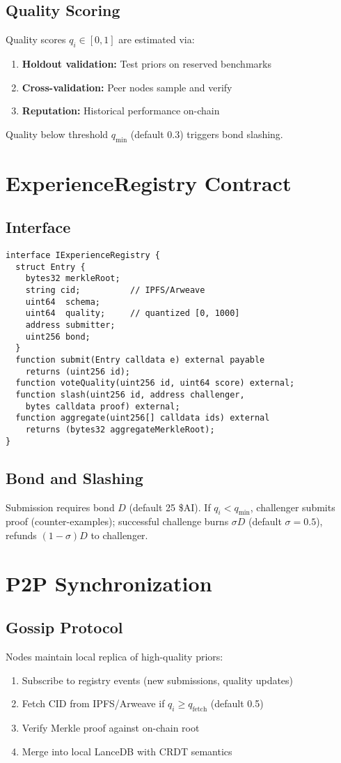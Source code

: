 \documentclass[11pt]{article}
\begin{document}
\subsection{Quality Scoring}
Quality scores \(q_i \in [0,1]\) are estimated via:
\begin{enumerate}
  \item \textbf{Holdout validation:} Test priors on reserved benchmarks
  \item \textbf{Cross-validation:} Peer nodes sample and verify
  \item \textbf{Reputation:} Historical performance on-chain
\end{enumerate}

Quality below threshold \(q_{\min}\) (default 0.3) triggers bond slashing.

\section{ExperienceRegistry Contract}
\subsection{Interface}
\begin{verbatim}
interface IExperienceRegistry {
  struct Entry {
    bytes32 merkleRoot;
    string cid;          // IPFS/Arweave
    uint64  schema;
    uint64  quality;     // quantized [0, 1000]
    address submitter;
    uint256 bond;
  }
  function submit(Entry calldata e) external payable
    returns (uint256 id);
  function voteQuality(uint256 id, uint64 score) external;
  function slash(uint256 id, address challenger,
    bytes calldata proof) external;
  function aggregate(uint256[] calldata ids) external
    returns (bytes32 aggregateMerkleRoot);
}
\end{verbatim}

\subsection{Bond and Slashing}
Submission requires bond \(D\) (default 25 \$AI). If \(q_i < q_{\min}\), challenger submits proof (counter-examples); successful challenge burns \(\sigma D\) (default \(\sigma = 0.5\)), refunds \((1-\sigma)D\) to challenger.

\section{P2P Synchronization}
\subsection{Gossip Protocol}
Nodes maintain local replica of high-quality priors:
\begin{enumerate}
  \item Subscribe to registry events (new submissions, quality updates)
  \item Fetch CID from IPFS/Arweave if \(q_i \ge q_{\text{fetch}}\) (default 0.5)
  \item Verify Merkle proof against on-chain root
  \item Merge into local LanceDB with CRDT semantics
\end{enumerate}
\end{document}
